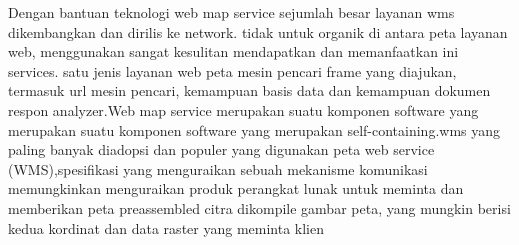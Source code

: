 Dengan bantuan teknologi web map service  sejumlah besar layanan wms dikembangkan dan dirilis ke network. tidak untuk organik di antara
peta layanan web, menggunakan sangat kesulitan mendapatkan dan memanfaatkan ini services. satu jenis layanan web peta mesin pencari
frame yang diajukan, termasuk url mesin pencari, kemampuan basis data dan kemampuan dokumen respon analyzer.Web map service merupakan suatu komponen software yang merupakan suatu komponen software yang merupakan self-containing.wms yang paling banyak  diadopsi dan populer yang digunakan peta web service (WMS),spesifikasi yang menguraikan sebuah mekanisme komunikasi memungkinkan menguraikan produk perangkat lunak untuk meminta dan memberikan peta preassembled citra dikompile gambar peta, yang mungkin berisi kedua kordinat dan data raster yang meminta klien




  
  
